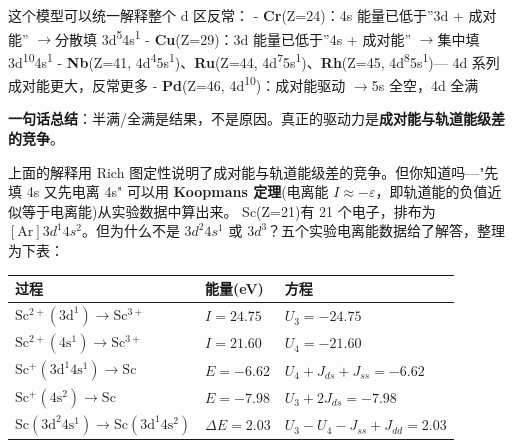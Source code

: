 \documentclass[a4paper,11pt]{ctexart}
\newcounter{none}
\newcommand{\箭}{\ensuremath{\rightarrow}}
\newcommand{\左箭}{\ensuremath{\leftarrow}}
\newcommand{\上箭}{\ensuremath{\uparrow}}
\newcommand{\下箭}{\ensuremath{\downarrow}}
\newcommand{\衡}{\ensuremath{\rightleftharpoons}}
\newcommand{\双箭}{\ensuremath{\leftrightarrow}}
\newcommand{\约等于}{\ensuremath{\approx}}
\newcommand{\小于等于}{\ensuremath{\leq}}
\newcommand{\大于等于}{\ensuremath{\geq}}
\newcommand{\不等于}{\ensuremath{\neq}}
\newcommand{\西格马}{\ensuremath{\sigma}}
\newcommand{\派}{\ensuremath{\pi}}
\begin{document}
这个模型可以统一解释整个 d 区反常：
- \textbf{Cr}(Z=24)：4s 能量已低于''3d + 成对能'' \箭 分散填 3d\textsuperscript{5}4s\textsuperscript{1}
- \textbf{Cu}(Z=29)：3d 能量已低于''4s + 成对能'' \箭 集中填 3d\textsuperscript{10}4s\textsuperscript{1}
- \textbf{Nb}(Z=41, 4d\textsuperscript{4}5s\textsuperscript{1})、\textbf{Ru}(Z=44, 4d\textsuperscript{7}5s\textsuperscript{1})、\textbf{Rh}(Z=45, 4d\textsuperscript{8}5s\textsuperscript{1})--- 4d 系列成对能更大，反常更多
- \textbf{Pd}(Z=46, 4d\textsuperscript{10})：成对能驱动 \箭 5s 全空，4d 全满

\textbf{一句话总结}：半满/全满是结果，不是原因。真正的驱动力是\textbf{成对能与轨道能级差的竞争}。

上面的解释用 Rich 图定性说明了成对能与轨道能级差的竞争。但你知道吗---"先填 4s 又先电离 4s" 可以用 \textbf{Koopmans 定理}(电离能 \(I \approx -\varepsilon\)，即轨道能的负值近似等于电离能)从实验数据中算出来。
Sc(Z=21)有 21 个电子，排布为 \([\mathrm{Ar}]3d^1 4s^2\)。但为什么不是 \(3d^2 4s^1\) 或 \(3d^3\)？五个实验电离能数据给了解答，整理为下表：

{\def\LTcaptype{none} %
\begin{longtable}[]{@{}
  >{\raggedright\arraybackslash}p{}
  >{\centering\arraybackslash}p{}
  >{\raggedright\arraybackslash}p{}@{}}
\toprule\noalign{}
\begin{minipage}[b]{\linewidth}\raggedright
过程
\end{minipage} & \begin{minipage}[b]{\linewidth}\centering
能量(eV)
\end{minipage} & \begin{minipage}[b]{\linewidth}\raggedright
方程
\end{minipage} \\
\midrule\noalign{}
\endhead
\bottomrule\noalign{}
\endlastfoot
\(\mathrm{Sc^{2+}(3d^1) \rightarrow Sc^{3+}}\) & \(I = 24.75\) & \(U_3 = -24.75\) \\
\(\mathrm{Sc^{2+}(4s^1) \rightarrow Sc^{3+}}\) & \(I = 21.60\) & \(U_4 = -21.60\) \\
\(\mathrm{Sc^{+}(3d^1 4s^1) \rightarrow Sc}\) & \(E = -6.62\) & \(U_4 + J_{ds} + J_{ss} = -6.62\) \\
\(\mathrm{Sc^{+}(4s^2) \rightarrow Sc}\) & \(E = -7.98\) & \(U_3 + 2J_{ds} = -7.98\) \\
\(\mathrm{Sc(3d^2 4s^1) \rightarrow Sc(3d^1 4s^2)}\) & \(\Delta E = 2.03\) & \(U_3 - U_4 - J_{ss} + J_{dd} = 2.03\) \\
\end{longtable}
}
\end{document}
